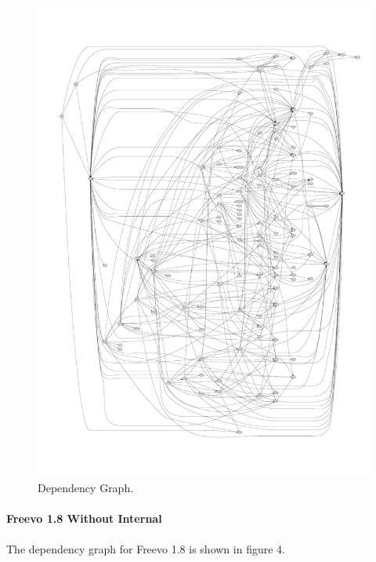 \documentclass[10.5pt,journal, a4paper]{IEEEtran}
\begin{document}
\begin{figure}[H]
 \centering 
 \includegraphics[width=\columnwidth]{freevo17less}
 \centering 
  \caption {Dependency Graph. }
 \end{figure}


\paragraph{Freevo 1.8 Without Internal}
\noindent
The dependency graph for Freevo 1.8 is shown in figure 4.
\end{document}
